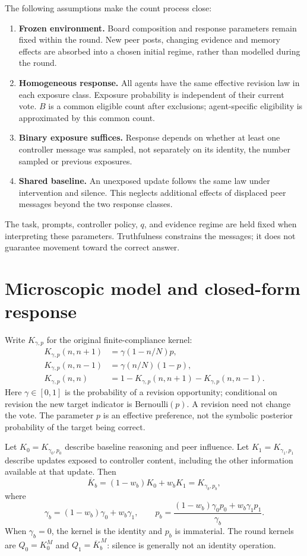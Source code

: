 \documentclass[11pt,a4paper]{article}
\begin{document}
The following assumptions make the count process close:
\begin{enumerate}
\setlength{\itemsep}{1pt}
\item \textbf{Frozen environment.} Board composition and response parameters remain fixed within the round. New peer posts, changing evidence and memory effects are absorbed into a chosen initial regime, rather than modelled during the round.
\item \textbf{Homogeneous response.} All agents have the same effective revision law in each exposure class. Exposure probability is independent of their current vote. $B$ is a common eligible count after exclusions; agent-specific eligibility is approximated by this common count.
\item \textbf{Binary exposure suffices.} Response depends on whether at least one controller message was sampled, not separately on its identity, the number sampled or previous exposures.
\item \textbf{Shared baseline.} An unexposed update follows the same law under intervention and silence. This neglects additional effects of displaced peer messages beyond the two response classes.
\end{enumerate}
The task, prompts, controller policy, $q$, and evidence regime are held fixed when interpreting these parameters. Truthfulness constrains the messages; it does not guarantee movement toward the correct answer.

\newpage
\section{Microscopic model and closed-form response}
Write $K_{\gamma,p}$ for the original finite-compliance kernel:
\begin{align}
 K_{\gamma,p}(n,n+1)&=\gamma(1-n/N)p,\\
 K_{\gamma,p}(n,n-1)&=\gamma(n/N)(1-p),\\
 K_{\gamma,p}(n,n)&=1-K_{\gamma,p}(n,n+1)-K_{\gamma,p}(n,n-1).
\end{align}
Here $\gamma\in[0,1]$ is the probability of a revision opportunity; conditional on revision the new target indicator is Bernoulli$(p)$. A revision need not change the vote. The parameter $p$ is an effective preference, not the symbolic posterior probability of the target being correct.

Let $K_0=K_{\gamma_0,p_0}$ describe baseline reasoning and peer influence. Let $K_1=K_{\gamma_1,p_1}$ describe updates exposed to controller content, including the other information available at that update. Then
\begin{equation}
 \overline K_b=(1-w_b)K_0+w_bK_1=K_{\gamma_b,p_b},
\end{equation}
where
\begin{equation}
 \gamma_b=(1-w_b)\gamma_0+w_b\gamma_1,\qquad
 p_b=\frac{(1-w_b)\gamma_0p_0+w_b\gamma_1p_1}{\gamma_b}.
 \label{eq:mix}
\end{equation}
When $\gamma_b=0$, the kernel is the identity and $p_b$ is immaterial. The round kernels are $Q_0=K_0^M$ and $Q_1=\overline K_b^{\,M}$: silence is generally not an identity operation.
\end{document}
